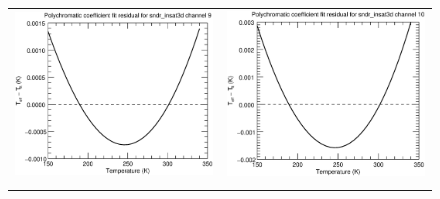 \begin{figure}[H]
\begin{tabular}{c c}
    \includegraphics[scale=0.35]{graphics/sndr/tfit/sndr_insat3d-9.tfit.eps} &
    \includegraphics[scale=0.35]{graphics/sndr/tfit/sndr_insat3d-10.tfit.eps} \\\\

\end{tabular}
\end{figure}
